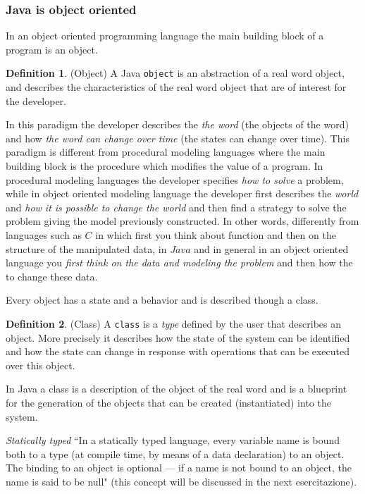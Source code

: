\documentclass{article}
\theoremstyle{definition}
\newtheorem{mydef}{Definition}
\begin{document}
\subsubsection{Java is object oriented}
In an object oriented programming language the main building block of a program is an object.
\begin{mydef} (Object) A Java \texttt{object} is an abstraction of a real word object, and  describes the characteristics of the real word object that are of interest for the developer.
\end{mydef}
In this paradigm the developer describes the \emph{the word} (the objects of the word) and how \emph{the word can change over time} (the states can change over time). This paradigm is different from procedural modeling languages where the main building block is the procedure which modifies the value of a program. In procedural modeling languages the developer specifies \emph{how to solve} a problem, while in object oriented modeling language the developer first describes the \emph{world} and \emph{how it is possible to change the world} and then find a strategy to solve the problem giving the model previously constructed. In other words, differently from languages such as $C$ in which first you think about function and then on the structure of the manipulated data, in $Java$ and in general in an object oriented language you \emph{first think on the data and modeling the problem} and then how the to change these data. 

Every object has a state and a behavior and is described though a class.

\begin{mydef} (Class) A \texttt{class} is a \emph{type} defined by the user that describes an object. More precisely it describes how the state of the system can be identified and how the state can change in response with operations that can be executed over this object.
\end{mydef}
In Java a class is a description of the object of the real word and is a blueprint for the generation of the objects that can be created (instantiated) into the system.


\emph{Statically typed} ``In a statically typed language, every variable name is bound both
to a type (at compile time, by means of a data declaration) to an object.
The binding to an object is optional — if a name is not bound to an object, the name is said to be null"\cite{StaticallyTyped} (this concept will be discussed in the next esercitazione).
\end{document}

